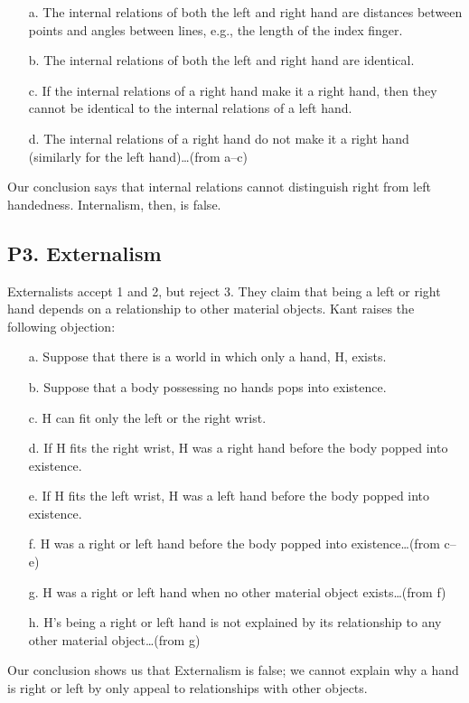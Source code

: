 \documentclass[oneside]{article}
\begin{document}
\begin{enumerate}

\item[a.]
  The internal relations of both the left and right hand are distances
  between points and angles between lines, e.g., the length of the index
  finger.
\item[b.]
  The internal relations of both the left and right hand are identical.
\item[c.]
  If the internal relations of a right hand make it a right hand, then
  they cannot be identical to the internal relations of a left hand.
\item[d.]
  The internal relations of a right hand do not make it a right hand
  (similarly for the left hand)\ldots{}(from a--c)
\end{enumerate}

Our conclusion says that internal relations cannot distinguish right
from left handedness. Internalism, then, is false. 

\subsection*{P3. Externalism}\label{p3.-externalism}

Externalists accept 1 and 2, but reject 3. They claim that being a left
or right hand depends on a relationship to other material objects. Kant raises the following objection:

\begin{enumerate}

\item[a.] 
  Suppose that there is a world in which only a hand, H, exists.
\item[b.]
  Suppose that a body possessing no hands pops into existence.
\item[c.]
  H can fit only the left or the right wrist.
\item[d.]
  If H fits the right wrist, H was a right hand before the body popped
  into existence.
\item[e.]
  If H fits the left wrist, H was a left hand before the body popped
  into existence.
\item[f.]
  H was a right or left hand before the body popped into
  existence\ldots{}(from c--e)
\item[g.]
  H was a right or left hand when no other material object
  exists\ldots{}(from f)
\item[h.]
  H's being a right or left hand is not explained by its relationship to
  any other material object\ldots{}(from g)
\end{enumerate}
Our conclusion shows us that Externalism is false; we cannot explain why a hand is right or left by only appeal to relationships with other objects. 
\end{document}
